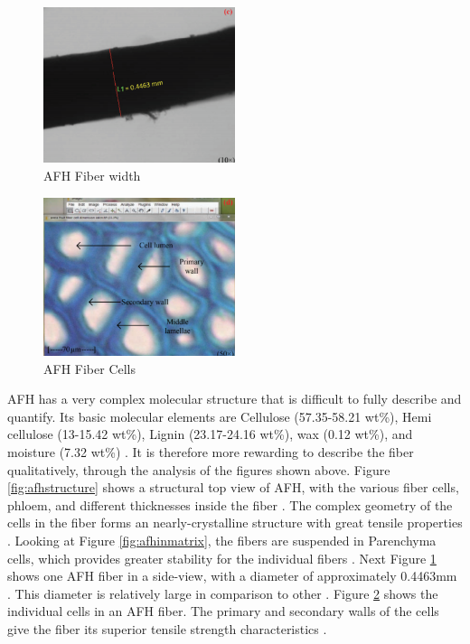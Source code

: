 \documentclass{article}
\begin{document}
\begin{figure}
  \centering
  \includegraphics[width=0.5\textwidth]{assets/afh_fiber.png}
  \caption{AFH Fiber width \protect\autocite{afhfiber}}
  \label{fig:afhfiber}
\end{figure}

\begin{figure}
  \centering
  \includegraphics[width=0.5\textwidth]{assets/afh_cells.png}
  \caption{AFH Fiber Cells \protect\autocite{afhfiber}}
  \label{fig:afhcell}
\end{figure}

AFH has a very complex molecular structure that is difficult to fully describe and quantify. Its basic molecular elements are Cellulose (57.35-58.21 wt\%), Hemi cellulose (13-15.42 wt\%), Lignin (23.17-24.16 wt\%), wax (0.12 wt\%), and moisture (7.32 wt\%) \autocite{afhfiber}. It is therefore more rewarding to describe the fiber qualitatively, through the analysis of the figures shown above. Figure \ref{fig:afhstructure} shows a structural top view of AFH, with the various fiber cells, phloem, and different thicknesses inside the fiber \autocite{afhfiber}. The complex geometry of the cells in the fiber forms an nearly-crystalline structure with great tensile properties \autocite{afhfiber}. Looking at Figure \ref{fig:afhinmatrix}, the fibers are suspended in Parenchyma cells, which provides greater stability for the individual fibers \autocite{afhfiber}. Next Figure \ref{fig:afhfiber} shows one AFH fiber in a side-view, with a diameter of approximately 0.4463mm \autocite{afhfiber}. This diameter is relatively large in comparison to other . Figure \ref{fig:afhcell} shows the individual cells in an AFH fiber. The primary and secondary walls of the cells give the fiber its superior tensile strength characteristics \autocite{afhfiber}.
\end{document}
